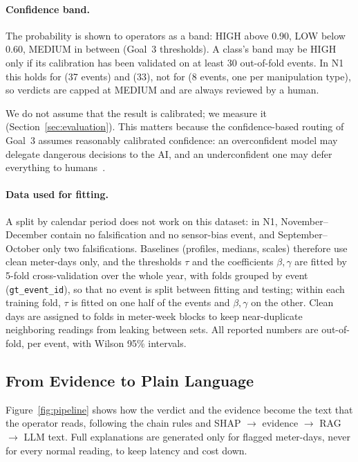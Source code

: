 \documentclass[11pt,a4paper]{article}
\begin{document}
\paragraph{Confidence band.} The probability is shown to operators as a band: HIGH above 0.90, LOW below
0.60, MEDIUM in between (Goal~3 thresholds). A class's band may be HIGH only if its calibration has been
validated on at least 30 out-of-fold events. In N1 this holds for \GE{} (37 events) and \MF{} (33), not for
\SD{} (8 events, one per manipulation type), so \SD{} verdicts are capped at MEDIUM and are always reviewed by
a human.

We do not assume that the result is calibrated; we measure it (Section~\ref{sec:evaluation}). This matters because the confidence-based routing of Goal~3 assumes reasonably calibrated confidence: an overconfident model may delegate dangerous decisions to the AI, and an underconfident one may defer everything to humans~\cite{trustcal}.

\paragraph{Data used for fitting.} A split by calendar period does not work on this dataset: in N1,
November--December contain no falsification and no sensor-bias event, and September--October only two
falsifications. Baselines (profiles, medians, scales) therefore use clean meter-days only, and the thresholds
$\tau$ and the coefficients $\beta,\gamma$ are fitted by 5-fold cross-validation over the whole year, with folds
grouped by event (\texttt{gt\_event\_id}), so that no event is split between fitting and testing; within each
training fold, $\tau$ is fitted on one half of the events and $\beta,\gamma$ on the other. Clean days are
assigned to folds in meter-week blocks to keep near-duplicate neighboring readings from leaking between sets.
All reported numbers are out-of-fold, per event, with Wilson 95\% intervals.

\subsection{From Evidence to Plain Language}
\label{sec:language}
Figure~\ref{fig:pipeline} shows how the verdict and the evidence become the text that the operator reads,
following the chain rules and SHAP $\rightarrow$ evidence $\rightarrow$ RAG $\rightarrow$ LLM text. Full
explanations are generated only for flagged meter-days, never for every normal reading, to keep latency and
cost down.
\end{document}
